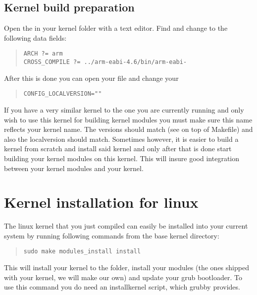 \subsection*{Kernel build preparation}

Open the  in your kernel folder with a text editor. Find and change to the following data fields:

\begin{quote} \begin{verbatim}ARCH ?= arm
CROSS_COMPILE ?= ../arm-eabi-4.6/bin/arm-eabi- \end{verbatim} \end{quote}

\npar

After this is done you can open your  file and change your 

\begin{quote} \begin{verbatim}CONFIG_LOCALVERSION="" \end{verbatim} \end{quote}

If you have a very similar kernel to the one you are currently running and only wish to use this kernel for building kernel modules you must make sure this name reflects your kernel name. The versions should match (see on top of Makefile) and also the localversion should match. 
\npar
Sometimes however, it is easier to build a kernel from scratch and install said kernel and only after that is done start building your kernel modules on this kernel. This will insure good integration between your kernel modules and your kernel.


\section*{Kernel installation for linux}

The linux kernel that you just compiled can easily be installed into your current system by running following commands from the base kernel directory:

\begin{quote} \begin{verbatim}sudo make modules_install install \end{verbatim} \end{quote}

This will install your kernel to the  folder, install your modules (the ones shipped with your kernel, we will make our own) and update your grub bootloader. To use this command you do need an installkernel script, which grubby provides.

